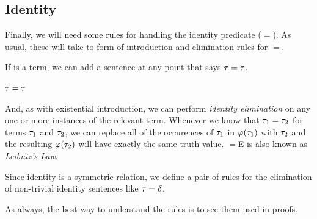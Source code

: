 \subsection{Identity}

Finally, we will need some rules for handling the identity predicate ($=$). As
usual, these will take to form of introduction and elimination rules for $=$.

If \etau is a term, we can add a sentence at any point that says $\tau=\tau$.

\begin{fitchrule}[Identity Introduction ($=$I)]
  \label{def:identity-introduction-rule}
  \leavevmode
  \vspace{-0.9\baselineskip}
  \begin{fitchproof}
     {$\tau=\tau$} 
  \end{fitchproof}
\end{fitchrule}

And, as with existential introduction, we can perform \emph{identity
elimination} on any one or more instances of the relevant term. Whenever we
know that $\tau_1=\tau_2$ for terms $\tau_1$ and $\tau_2$, we can replace
all of the occurences of $\tau_1$ in $\varphi(\tau_1)$ with $\tau_2$ and the
resulting $\varphi(\tau_2)$ will have exactly the same truth value. $=$E is also
known as \emph{Leibniz's Law}.

\begin{fitchrule}[Leibniz's Law ($=$E)]
  \label{def:identity-elimination-rule}
  Since identity is a symmetric relation, we define a pair of rules for the
  elimination of non-trivial identity sentences like $\tau=\delta$. \\
  \leavevmode
  \vspace{-0.9\baselineskip}
\end{fitchrule}

As always, the best way to understand the rules is to see them used in proofs.

